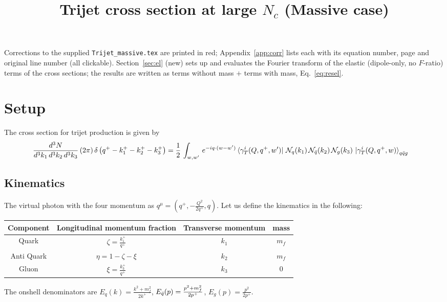 \documentclass[9pt]{article}
\title{Trijet cross section at large $N_{c}$ (Massive case)}
\author{}
\date{}
\newif\ifmarked \markedtrue
\numberwithin{equation}{section}
\begin{document}
\maketitle
\noindent\ifmarked{\color{red}\textbf{Marked version.}} Corrections to the supplied \texttt{Trijet\_massive.tex} are printed in {\color{red}red}; Appendix~\ref{app:corr} lists each with its equation number, page and original line number (all clickable). \fi Section~\ref{sec:el} (new) sets up and evaluates the Fourier transform of the elastic (dipole-only, no $F$-ratio) terms of the cross sections; the results are written as terms without mass $+$ terms with mass, Eq.~\eqref{eq:resel}.
\section{Setup}
The cross section for trijet production is given by
\begin{align}
    \frac{d^{3}N}{d^{3}k_{1}\,d^{3}k_{2}\, d^{3}k_{3}}\, (2\pi)\,\delta\left(q^{+}-k^{+}_{1}-k^{+}_{2}-k^{+}_{3}\right) & =  \frac{1}{2}\,\int_{w,w'}\, e^{-iq\cdot (w-w')} 
\bra{\gamma^{i}_{T}(Q,q^{+},w')}\,\mathcal{N}_{q}(k_{1})\,\mathcal{N}_{\Bar{q}}(k_{2})\,\mathcal{N}_{g}(k_{3})\,\ket{\gamma^{i}_{T}(Q,q^{+},w)}_{q\Bar{q}g}
\end{align}
\subsection{Kinematics}
The virtual photon with the four momentum as $q^{\mu} = \left(q^{+},-\frac{Q^{2}}{2q^{+}},q\right)$. Let us define the kinematics in the following:
\begin{table}[h!]
\centering
\begin{tabular}{||c c c c||} 
 \hline
 Component & Longitudinal momentum fraction & Transverse momentum & mass \\ [0.5ex] 
 \hline\hline
 Quark & $\zeta = \frac{k^{+}_{1}}{q^{+}}$  & $k_{1}$ & $m_{f}$ \\ 
 Anti Quark & $\eta = 1-\zeta-\xi$  &  $k_{2}$ & $m_{f}$ \\
 Gluon & $\xi = \frac{k^{+}_{3}}{q^{+}}$ & $k_{3}$ & $0$ \\
 \hline
\end{tabular}
\label{table:1}
\end{table}
The onshell denominators are $E_{q}(k) = \frac{k^{2}+m_{f}^{2}}{2k^{+}}$, $E_{\Bar{q}}(p) = \frac{p^{2}+m_{f}^{2}}{2p^{+}}$, $E_{g}(p) = \frac{p^{2}}{2p^{+}}$.  
\end{document}
